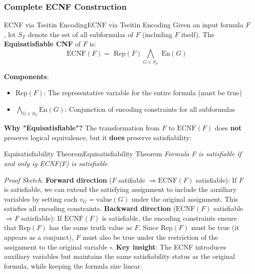 \documentclass[a4paper]{article}
\theoremstyle{definition}
\begin{document}
\subsubsection{Complete ECNF Construction}
\begin{definition}{ECNF via Tseitin Encoding}{ECNF via Tseitin Encoding}
Given an input formula \( F \), let \( S_F \) denote the set of all subformulas of \( F \) (including $F$ itself).
The \textbf{Equisatisfiable CNF} of \( F \) is:
\[
  \text{ECNF}(F) = \text{ Rep}(F) \bigwedge_{G \in S_F} \text{ En}(G)
\]
\end{definition}
\textbf{Components}:
\begin{itemize}
    \item \( \text{Rep}(F) \): The representative variable for the entire formula (must be true)
    \item \( \bigwedge_{G \in S_F} \text{En}(G) \): Conjunction of encoding constraints for all subformulas
\end{itemize}
\textbf{Why "Equisatisfiable"?}
\vspace{1em}
\noindent
\newline
The transformation from \( F \) to \( \text{ECNF}(F) \) does \textbf{not} preserve logical equivalence, but it \textbf{does}
preserve satisfiability:
\begin{theorem}{Equisatisfiability Theorem}{Equisatisfiability Theorem}
\textit{Formula F is satisfiable if and only ig ECNF(F) is satisfiable}
\end{theorem}
\textit{Proof Sketch}. \textbf{Forward direction} ($F$ satifiable $\Rightarrow \text{ECNF}(F)$ satisfiable): If $F$ is satisfiable,
we can extend the satisfying assignment to include the auxiliary variables by setting each \( v_G = \text{value}(G) \) under 
the original assignment. This satisfies all encoding constraints.
\vspace{1em}
\noindent
\newline
\textbf{Backward direction} ($\text{ECNF}(F)$ satisfiable $\Rightarrow F$ satisfiable): If $\text{ECNF}(F)$ is satisfiable, the encoding 
constraints ensure that \( \text{Rep}(F) \) has the same truth value as \( F \). Since \( \text{Rep}(F) \) must be 
true (it appears as a conjunct), \( F \) must also be true under the restriction of the assignment to the original variable \( \square \).
\vspace{1em}
\noindent
\newline
\textbf{Key insight}: The ECNF introduces auxiliary variables but maintains the same satisfiability status as the original formula,
while keeping the formula size linear.
\end{document}
